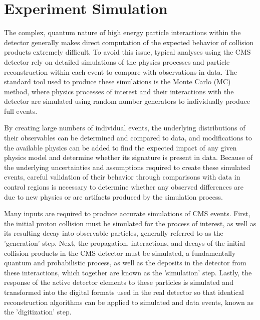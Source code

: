 \chapter{Experiment Simulation}
\label{simulation_chapter}
The complex, quantum nature of high energy particle interactions within the detector generally makes direct computation of the expected behavior of collision products extremely difficult.
To avoid this issue, typical analyses using the CMS detector rely on detailed simulations of the physics processes and particle reconstruction within each event to compare with observations in data.
The standard tool used to produce these simulations is the Monte Carlo (MC) method, where physics processes of interest and their interactions with the detector are simulated using random number generators to individually produce full events.

By creating large numbers of individual events, the underlying distributions of their observables can be determined and compared to data, and modifications to the available physics can be added to find the expected impact of any given physics model and determine whether its signature is present in data.
Because of the underlying uncertainties and assumptions required to create these simulated events, careful validation of their behavior through comparisons with data in control regions is necessary to determine whether any observed differences are due to new physics or are artifacts produced by the simulation process.

Many inputs are required to produce accurate simulations of CMS events.
First, the initial proton collision must be simulated for the process of interest, as well as its resulting decay into observable particles, generally referred to as the 'generation' step.
Next, the propagation, interactions, and decays of the initial collision products in the CMS detector must be simulated, a fundamentally quantum and probabilistic process, as well as the deposits in the detector from these interactions, which together are known as the 'simulation' step.
Lastly, the response of the active detector elements to these particles is simulated and transformed into the digital formats used in the real detector so that identical reconstruction algorithms can be applied to simulated and data events, known as the 'digitization' step.


